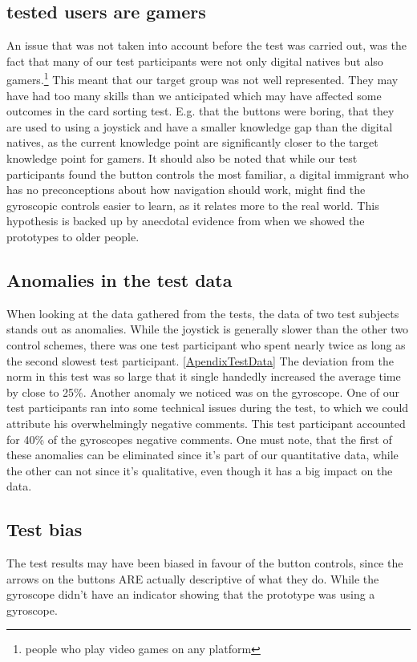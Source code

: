 \subsection*{tested users are gamers} \label{TestedUsersAreGamers}
An issue that was not taken into account before the test was carried out, was the fact that many of our test participants were not only digital natives but also gamers.\footnote{people  who play video games on any platform} This meant that our target group was not well represented. They may have had too many skills than we anticipated which may have affected some outcomes in the card sorting test. E.g. that the buttons were boring, that they are used to using a joystick and have a smaller knowledge gap than the digital natives, as the current knowledge point are significantly closer to the target knowledge point for gamers. 
It should also be noted that while our test participants found the button controls the most familiar, a digital immigrant who has no preconceptions about how navigation should work, might find the gyroscopic controls easier to learn, as it relates more to the real world. This hypothesis is backed up by anecdotal evidence from when we showed the prototypes to older people. 
\subsection*{Anomalies in the test data}
When looking at the data gathered from the tests, the data of two test subjects stands out as anomalies. While the joystick is generally slower than the other two control schemes, there was one test participant who spent nearly twice as long as the second slowest test participant. \ref{ApendixTestData}
The deviation from the norm in this test was so large that it single handedly increased the average time by close to 25\%.
Another anomaly we noticed was on the gyroscope. One of our test participants ran into some technical issues during the test, to which we could attribute his overwhelmingly negative comments. This test participant accounted for 40\% of the gyroscopes negative comments.
One must note, that the first of these anomalies can be eliminated since it's part of our quantitative data, while the other can not since it's qualitative, even though it has a big impact on the data. %
\subsection*{Test bias}
The test results may have been biased in favour of the button controls, since the arrows on the buttons ARE actually descriptive of what they do. While the gyroscope didn't have an indicator showing that the prototype was using a gyroscope.

